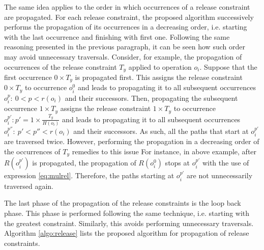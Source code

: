 The same idea applies to the order in which occurrences of a release constraint are propagated. For each release constraint, the proposed algorithm successively performs the propagation of its occurrences in a decreasing order, i.e. starting with the last occurrence and finishing with first one. Following the same reasoning presented in the previous paragraph, it can be seen how such order may avoid unnecessary traversals. Consider, for example, the propagation of occurrences of the release constraint $T_y$ applied to operation $o_i$. Suppose that the first occurrence $0 \times T_y$ is propagated first. This assigns the release constraint $0 \times T_y$ to occurrence $o_i^0$ and leads to propagating it to all subsequent occurrences $o_i^{p}:\ 0 < p < r(o_i) $ and their successors. Then, propagating the subsequent occurrence $1 \times T_y$ assigns the release constraint $1 \times T_y$ to occurrence $o_i^{p'}: p' = 1 \times \frac{T_y}{H(o_i)}$ and leads to propagating it to all subsequent occurrences $o_i^{p''}:\ p' < p'' < r(o_i) $ and their successors. As such, all the paths that start at $o_i^{p'}$ are traversed twice. However, performing the propagation in a decreasing order of the occurrences of $T_y$ remedies to this issue For instance, in above example, after $R(o_i^{p'})$ is propagated, 
the propagation of $R(o_i^0)$ stops at $o_i^{p'}$ with the use of expression \ref{eq:mulrel}. Therefore, the paths starting at $o_i^{p'}$ are not unnecessarily traversed again.

The last phase of the propagation of the release constraints is the loop back phase. This phase is performed following the same technique, i.e. starting with the greatest constraint. Similarly, this avoids performing unnecessary traversals. Algorithm \ref{algo:release} lists the proposed algorithm for propagation of release constraints.

